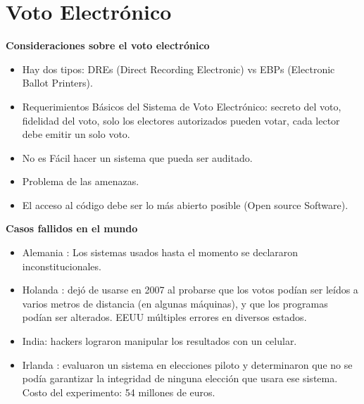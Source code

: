 \section{Voto Electrónico}

{\bf Consideraciones sobre el voto electrónico}
\begin{itemize}
\item Hay dos tipos: DREs (Direct Recording Electronic)  vs  EBPs (Electronic Ballot Printers).
\item Requerimientos Básicos del Sistema de Voto Electrónico: secreto del voto, fidelidad del voto, solo los electores autorizados pueden votar, cada lector debe emitir un solo voto.
\item No es Fácil hacer un sistema que pueda ser auditado.
\item Problema de las amenazas.
\item El acceso al código debe ser lo más abierto posible (Open source Software).
\end{itemize}

{\bf Casos fallidos en el mundo}

\begin{itemize}
\item Alemania : Los sistemas usados hasta el momento se declararon inconstitucionales.
\item Holanda : dejó de usarse en 2007 al probarse que los votos podían ser leídos a varios metros de distancia (en algunas máquinas), y que los programas podían ser alterados. EEUU múltiples errores en diversos estados.
\item India:  hackers lograron manipular los resultados con un celular. 
\item Irlanda : evaluaron un sistema en elecciones piloto y determinaron que no se podía garantizar la integridad de ninguna elección que usara ese sistema. Costo del experimento: 54 millones de euros.
\end{itemize}

